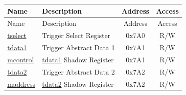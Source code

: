 \begin{longtable}{ | p{4.0cm} | p{8.4cm} | c | c| }
\hline\rowcolor{lightgray}
Name & Description & Address & Access \\ \hline
\endfirsthead
\hline
\rowcolor{lightgray}
Name & Description & Address & Access  \\ \hline
\endhead
\endfoot

\hyperref[regdesc:LPTSELECT]{tselect} & Trigger Select Register & 0x7A0 & R/W \\\hline
\hyperref[regdesc:LPTDATA1]{tdata1} & Trigger Abstract Data 1 & 0x7A1 & R/W \\\hline
\hyperref[regdesc:LPMCONTROL]{mcontrol} & \hyperref[regdesc:LPTDATA1]{tdata1} Shadow Register & 0x7A1 & R/W \\\hline
\hyperref[regdesc:LPTDATA2]{tdata2} & Trigger Abstract Data 2 & 0x7A2 & R/W \\\hline
\hyperref[regdesc:LPMADDRESS]{maddress} & \hyperref[regdesc:LPTDATA2]{tdata2} Shadow Register & 0x7A2 & R/W \\\hline
\end{longtable}
